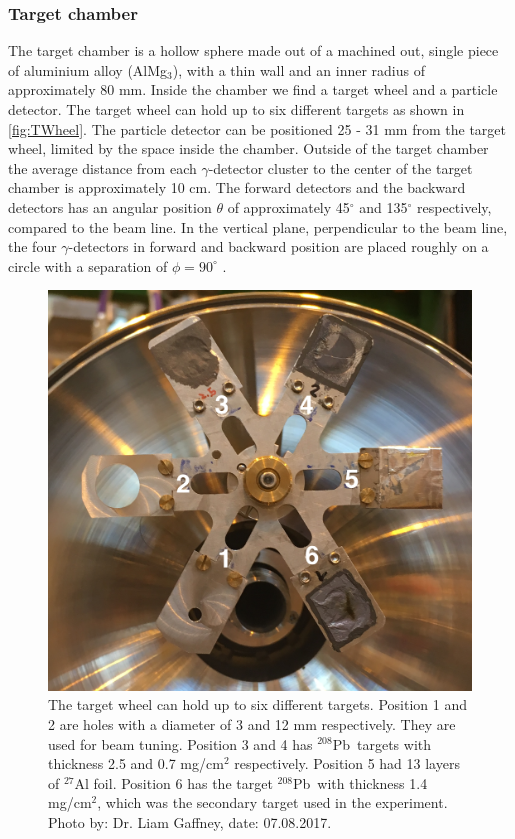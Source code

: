 \documentclass[twoside,english]{uiofysmaster/uiofysmaster}
\newcommand{\Pb}{$^{208}$Pb}
\newcommand{\ga}{$\gamma$}
\let\orgautoref\autoref
\renewcommand{\autoref}
        {%
		 \def\subsectionautorefname{Section}%
		 \def\subsubsectionautorefname{Section}%
          \orgautoref}
\begin{document}
\subsubsection{Target chamber}
The target chamber is a hollow sphere made out of a machined out, single piece of aluminium alloy (AlMg$_3$), with a thin wall and an inner radius of approximately 80 mm. Inside the chamber we find a target wheel and a particle detector. The target wheel can hold up to six different targets as shown in \autoref{fig:TWheel}. The particle detector can be positioned 25 - 31 mm from the target wheel, limited by the space inside the chamber. Outside of the target chamber the average distance from each \ga-detector cluster to the center of the target chamber is approximately 10 cm. The forward detectors and the backward detectors has an angular position $\theta$ of approximately 45$^\circ$ and 135$^\circ$ respectively, compared to the beam line. In the vertical plane, perpendicular to the beam line, the four \ga-detectors in forward and backward position are placed roughly on a circle with a separation of $\phi = 90^\circ$ \cite{MB-spect}.  

\begin{figure}[ht]
	\centering
	\includegraphics[width=0.8\linewidth]{Images/Target-wheel.png}
	\caption{The target wheel can hold up to six different targets. Position 1 and 2 are holes with a diameter of 3 and 12 mm respectively. They are used for beam tuning. Position 3 and 4 has \Pb\ targets with thickness 2.5 and 0.7 mg/cm$^2$ respectively. Position 5 had 13 layers of $^{27}$Al foil. Position 6 has the target \Pb\ with thickness 1.4 mg/cm$^2$, which was the secondary target used in the experiment. Photo by: Dr. Liam Gaffney, date: 07.08.2017.}
	\label{fig:TWheel}
\end{figure}
\end{document}
